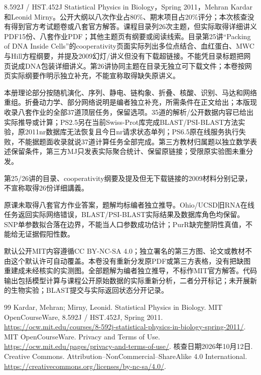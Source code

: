 8.592J / HST.452J Statistical Physics in Biology，Spring 2011，Mehran Kardar和Leonid Mirny。公开大纲以八次作业占80\%、期末项目占20\%评分；本次核查没有得到官方考试题卷或八套官方解答。课程目录列26次主题，但实际取得详细讲义PDF15份、八套作业PDF；其他主题页有纲要或阅读线索。目录第25讲“Packing of DNA Inside Cells”的cooperativity页面实际列出多位点结合、血红蛋白、MWC与Hill方程纲要，并提及2009幻灯/讲义但没有下载超链接。不能凭目录标题把网页说成DNA包装详细讲义。第26讲协同主题在目录无独立可下载文件；本卷按网页实际纲要作明示独立补充，不能宣称取得缺失原讲义。

本册理论部分按随机演化、序列、静电、链构象、折叠、核酸、识别、马达和网络重组。折叠动力学、部分网络说明是编者独立补充，所需条件在正文给出；本版现收录八套作业的全部37道顶层任务，保留选项。35道的解析/公开数据内容已给出实际推导或计算；PS2.5另在当前Swiss-Prot库完成BLAST/PSI-BLAST方法实验，原2011nr数据库无法恢复且今日nr请求状态单列；PS6.5原在线服务执行失败，不能据题面收录就说37道计算任务全部完成。第三方教材归属题以独立数学表述保留条件，第三方MJ只发表实际聚合统计、保留原链接；受限原实验图未重分发。

第25/26讲的目录、cooperativity纲要及提及但无下载链接的2009材料分别记录，不宣称取得26份详细講義。

原课未取得八套官方作业答案，题解均标编者独立推导。Ohio/UCSD旧RNA在线任务返回实际网络错误，BLAST/PSI-BLAST实际结果及数据库角色均保留。SNP单参数拟合落在边界，不能当人口参数成功估计；PurR缺完整阴性真值，不能给无证据假阳性数。

默认公开MIT内容遵循CC BY-NC-SA 4.0；独立署名的第三方图、论文或教材不由这个默认许可自动覆盖。本卷没有重新分发原PDF或第三方表格，没有把缺图重建成未经核实的实测图。全部题解为编者独立推导，不标作MIT官方解答。代码输出包括模型计算与课程公开原始数据的实际重新分析，二者分开标记；未开展新的生物实验；BLAST提交与实际返回状态分开记录。
\begin{thebibliography}{99}
 Kardar, Mehran; Mirny, Leonid. Statistical Physics in Biology. MIT OpenCourseWare, 8.592J / HST.452J, Spring 2011. \url{https://ocw.mit.edu/courses/8-592j-statistical-physics-in-biology-spring-2011/}.
 MIT OpenCourseWare. Privacy and Terms of Use. \url{https://ocw.mit.edu/pages/privacy-and-terms-of-use/}. 核查日期2026年10月12日.
 Creative Commons. Attribution--NonCommercial--ShareAlike 4.0 International. \url{https://creativecommons.org/licenses/by-nc-sa/4.0/}.
\end{thebibliography}
